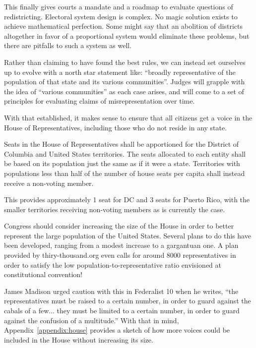 \documentclass{article}
\newcommand{\quotes}[1]{``#1''}
\begin{document}
This finally gives courts a mandate and a roadmap to evaluate questions of redistricting. Electoral system design is complex. No magic solution exists to achieve mathematical perfection. Some might say that an abolition of districts altogether in favor of a proportional system would eliminate these problems, but there are pitfalls to such a system as well.

Rather than claiming to have found the best rules, we can instead set ourselves up to evolve with a north star statement like: \quotes{broadly representative of the population of that state and its various communities}. Judges will grapple with the idea of \quotes{various communities} as each case arises, and will come to a set of principles for evaluating claims of misrepresentation over time.

With that established, it makes sense to ensure that all citizens get a voice in the House of Representatives, including those who do not reside in any state.

\begin{quoting}
Seats in the House of Representatives shall be apportioned for the District of Columbia and United States territories. The seats allocated to each entity shall be based on its population just the same as if it were a state. Territories with populations less than half of the number of house seats per capita shall instead receive a non-voting member.
\end{quoting}

This provides approximately 1 seat for DC and 3 seats for Puerto Rico, with the smaller territories receiving non-voting members as is currently the case.

Congress should consider increasing the size of the House in order to better represent the large population of the United States. Several plans to do this have been developed, ranging from a modest increase to a gargantuan one\cite{Allen}. A plan provided by thiry-thousand.org even calls for around 8000 representatives in order to satisfy the low population-to-representative ratio envisioned at constitutional convention\cite{30000}!

James Madison urged caution with this in Federalist 10 when he writes, \quotes{the representatives must be raised to a certain number, in order to guard against the cabals of a few... they must be limited to a certain number, in order to guard against the confusion of a multitude.}\cite{Federalist10} With that in mind, Appendix~\ref{appendix:house} provides a sketch of how more voices could be included in the House without increasing its size.
\end{document}
